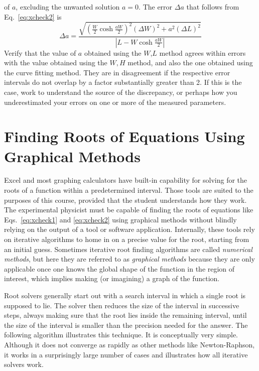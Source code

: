 \documentclass{revtex4}
\begin{document}
of $a$, excluding the unwanted solution $a=0$. The error $\Delta a$
that follows from Eq.~\ref{eq:xcheck2} is
\begin{equation}
\Delta a = \frac{\sqrt{\left(\frac{W}{2}\cosh{\frac{aW}{2}}\right)^2
(\Delta W)^2 +a^2(\Delta L)^2}}{\left| L-W\cosh{\frac{aW}{2}}\right|}
\label{eq:xcheck2err}
\end{equation}
Verify that the value of $a$ obtained using the $W$,$L$ method agrees
within errors with the value obtained using the $W,H$ method, and also
the one obtained using the curve fitting method. They are in disagreement
if the respective error intervals do not overlap by a factor substantially
greater than 2. If this is the case, work to understand the source of the
discrepancy, or perhaps how you underestimated your errors on one or 
more of the measured parameters.

\section{Finding Roots of Equations Using Graphical Methods}

Excel and most graphing calculators have built-in capability for solving
for the roots of a function within a predetermined interval. Those tools
are suited to the purposes of this course, provided that the student
understands how they work. The experimental physicist must be capable of
finding the roots of equations like Eqs.~\ref{eq:xcheck1} and \ref{eq:xcheck2}
using graphical methods without blindly relying on the output of a tool or
software application.  Internally, these tools rely on iterative algorithms
to home in on a precise value for the root, starting from an initial guess.
Sometimes iterative root finding algorithms are called {\em numerical methods},
but here they are referred to as {\em graphical methods} because they are
only applicable once one knows the global shape of the function in the region
of interest, which implies making (or imagining) a graph of the function.

Root solvers generally start out with a search interval in which a single
root is supposed to lie. The solver then reduces the size of the interval
in successive steps, always making sure that the root lies inside the
remaining interval, until the size of the interval is smaller than the
precision needed for the answer. The following algorithm illustrates this
technique.  It is conceptually very simple. Although it does not converge
as rapidly as other methods like Newton-Raphson, it works in a surprisingly
large number of cases and illustrates how all iterative solvers work.
\end{document}
